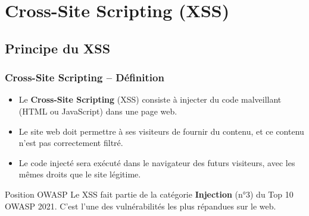 \documentclass{beamer}
\def\emptyline{\vspace{10pt}}
\begin{document}
\section{Cross-Site Scripting (XSS)}


\subsection{Principe du XSS}

\begin{frame}
\frametitle{Cross-Site Scripting -- Définition}

\begin{itemize}
\item Le \textbf{Cross-Site Scripting} (XSS) consiste à injecter du code malveillant (HTML ou JavaScript) dans une page web.
\item Le site web doit permettre à ses visiteurs de fournir du contenu, et ce contenu n'est \alert{pas correctement filtré}.
\item Le code injecté sera exécuté dans le navigateur des futurs visiteurs, avec les \alert{mêmes droits} que le site légitime.
\end{itemize}

\emptyline
\begin{block}{Position OWASP}
Le XSS fait partie de la catégorie \textbf{Injection} (n°3) du Top 10 OWASP 2021. C'est l'une des vulnérabilités les plus répandues sur le web.
\end{block}
\end{frame}
\end{document}
